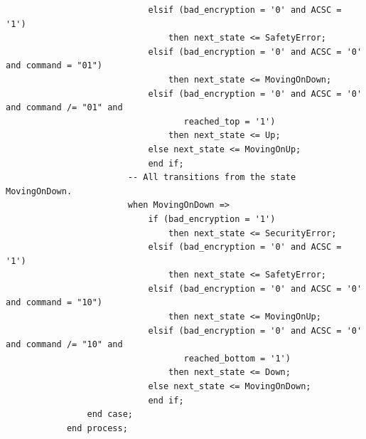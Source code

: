 \documentclass[a4paper,11pt]{article}
\begin{document}
\begin{verbatim}
                            elsif (bad_encryption = '0' and ACSC = '1')
                                then next_state <= SafetyError;
                            elsif (bad_encryption = '0' and ACSC = '0' and command = "01")
                                then next_state <= MovingOnDown;
                            elsif (bad_encryption = '0' and ACSC = '0' and command /= "01" and
                                   reached_top = '1')
                                then next_state <= Up;
                            else next_state <= MovingOnUp;
	                        end if;
                        -- All transitions from the state MovingOnDown.
                        when MovingOnDown =>
                            if (bad_encryption = '1')
                                then next_state <= SecurityError;
                            elsif (bad_encryption = '0' and ACSC = '1')
                                then next_state <= SafetyError;
                            elsif (bad_encryption = '0' and ACSC = '0' and command = "10")
                                then next_state <= MovingOnUp;
                            elsif (bad_encryption = '0' and ACSC = '0' and command /= "10" and
                                   reached_bottom = '1')
                                then next_state <= Down;
                            else next_state <= MovingOnDown;
	                        end if;
                end case;
            end process;


\end{verbatim}
\end{document}
